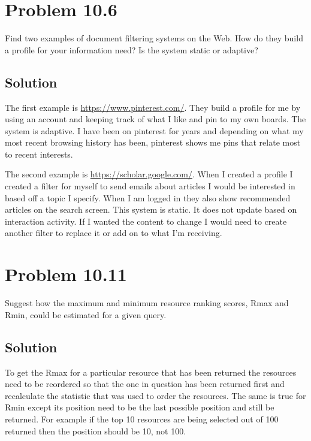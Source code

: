 \documentclass[letterpaper,12pt]{article}
\begin{document}
\pagebreak

\section{Problem 10.6}
Find two examples of document filtering systems on the Web. How do they build a profile for your information need? Is the system static or adaptive?

\subsection{Solution}

The first example is \url{https://www.pinterest.com/}.  They build a profile for me by using an account and keeping track of what I like and pin to my own boards. The system is adaptive. I have been on pinterest for years and depending on what my most recent browsing history has been, pinterest shows me pins that relate most to recent interests.

The second example is \url{https://scholar.google.com/}. When I created a profile I created a filter for myself to send emails about articles I would be interested in based off a topic I specify. When I am logged in they also show recommended articles on the search screen. This system is static. It does not update based on interaction activity. If I wanted the content to change I would need to create another filter to replace it or add on to what I'm receiving. 

\section{Problem 10.11}
Suggest how the maximum and minimum resource ranking scores, Rmax and Rmin, could be estimated for a given query.

\subsection{Solution}
To get the Rmax for a particular resource that has been returned the resources need to be reordered so that the one in question has been returned first and recalculate the statistic that was used to order the resources. The same is true for Rmin except its position need to be the last possible position and still be returned. For example if the top 10 resources are being selected out of 100 returned then the position should be 10, not 100.

\pagebreak
\end{document}
